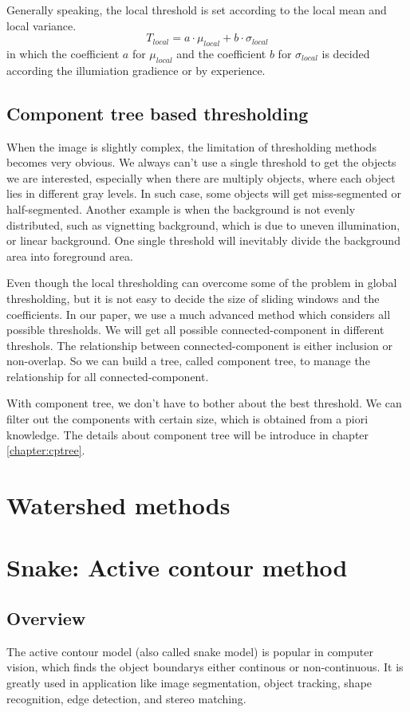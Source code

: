 Generally speaking, the local threshold is set according to the local mean and local variance.
\begin{equation}
T_{local} = a\cdot\mu_{local} + b\cdot\sigma_{local}
\end{equation}
in which the coefficient $a$ for $\mu_{local}$ and the coefficient $b$ for $\sigma_{local}$ is decided according the illumiation gradience or by experience.
\subsection{Component tree based thresholding} \label{sec:thresh-cptree}
When the image is slightly complex, the limitation of thresholding methods becomes very obvious. We always can't use a single threshold to get the objects we are interested, especially when there are multiply objects, where each object lies in different gray levels. In such case, some objects will get miss-segmented or half-segmented. Another example is when the background is not evenly distributed, such as vignetting background, which is due to uneven illumination, or linear background. One single threshold will inevitably divide the background area into foreground area.

Even though the local thresholding can overcome some of the problem in global thresholding, but it is not easy to decide the size of sliding windows and the coefficients. In our paper, we use a much advanced method which considers all possible thresholds. We will get all possible connected-component in different threshols. The relationship between connected-component is either inclusion or non-overlap. So we can build a tree, called component tree, to manage the relationship for all connected-component. 

With component tree, we don't have to bother about the best threshold. We can filter out the components with certain size, which is obtained from a piori knowledge. The details about component tree will be introduce in chapter \ref{chapter:cptree}.
\section{Watershed methods}
\section{Snake: Active contour method}
\subsection{Overview}
The active contour model\cite{kass1988snakes} (also called snake model) is popular in computer vision, which finds the object boundarys either continous or non-continuous. It is greatly used in application like image segmentation, object tracking, shape recognition, edge detection, and stereo matching.

